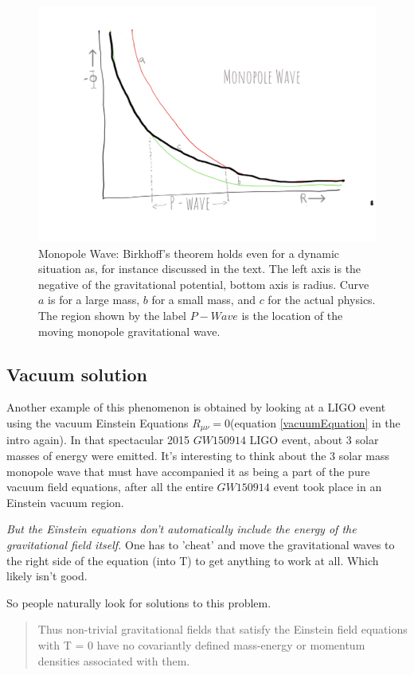 \documentclass[../rzero]{subfiles}
\begin{document}
\begin{figure}
\includegraphics[width=\textwidth]{chapters/images/monopole.png}
\caption{Monopole Wave: Birkhoff's theorem holds even for a dynamic situation as, for instance discussed in the text. The left axis is the negative of the gravitational potential, bottom axis is radius. Curve $a$ is for a large mass, $b$ for a small mass, and $c$ for the actual physics. The region shown by the label $P - Wave$ is the location of the moving monopole gravitational wave.}
\label{monopoleFigure}
\end{figure}


\subsection{Vacuum solution}
Another example of this phenomenon is obtained by looking at a LIGO\cite{abbott2016gw150914} event using the vacuum Einstein Equations $R_{\mu\nu} = 0$(equation \ref{vacuumEquation} in the intro again). In that spectacular 2015 $GW150914$ LIGO event, about 3 solar masses of energy were emitted. It's interesting to think about the 3 solar mass monopole wave that must have accompanied it as being a part of the pure vacuum field equations, after all the entire $GW150914$ event took place in an Einstein vacuum region.   

\textit{But the Einstein equations don't automatically include the energy of the gravitational field itself.} One has to 'cheat' and move the gravitational waves to the right side of the equation (into T) to get anything to work at all. Which likely isn't good. 

So people naturally look for solutions to this problem. \cite{dereliEnergyMomentumDensityGravitational2004}  
\begin{quotation}
	Thus non-trivial gravitational fields that satisfy the Einstein field equations with T = 0 have no covariantly defined mass-energy or momentum densities associated with them.
\end{quotation}
\end{document}
